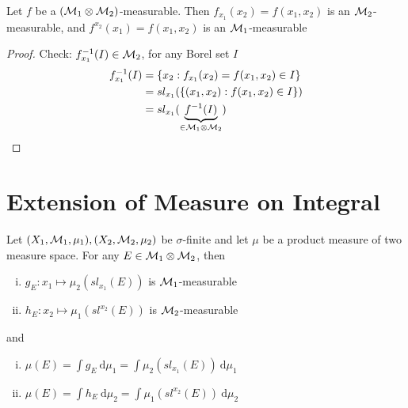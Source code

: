 \begin{lemma}
  Let $f$ be a $(\mathcal M_1 \otimes \mathcal M_2)$-measurable. Then $f_{x_1}(x_2) = f(x_1, x_2)$ is an $\mathcal M_2$-measurable,
  and $f^{x_2}(x_1) = f(x_1, x_2)$ is an $\mathcal M_1$-measurable
\end{lemma}

\begin{proof}
  Check: $f^{-1}_{x_1}(I) \in \mathcal M_2$, for any Borel set $I$
  \begin{align*}
    f^{-1}_{x_1}(I) &= \{x_2 : f_{x_1}(x_2) = f(x_1, x_2) \in I\} \\
    &= sl_{x_1}(\{(x_1, x_2) : f(x_1, x_2) \in I\}) \\
    &= sl_{x_1}(\underbrace{f^{-1}(I)}_{\in \mathcal M_1 \otimes \mathcal M_2})
  \end{align*}
\end{proof}

\section{Extension of Measure on Integral}

\begin{theorem}
  Let $(X_1, \mathcal M_1, \mu_1), (X_2, \mathcal M_2, \mu_2)$ be $\sigma$-finite and let $\mu$  be a product measure of two measure space.
  For any $E \in \mathcal M_1 \otimes \mathcal M_2$, then
  \begin{enumerate}[(i)]
    \item $g_E : x_1 \mapsto \mu_2(sl_{x_1}(E))$ is $\mathcal M_1$-measurable
    \item $h_E : x_2 \mapsto \mu_1(sl^{x_2}(E))$ is $\mathcal M_2$-measurable
  \end{enumerate}
  and 
  \begin{enumerate}[(i)]
    \item $\mu(E) = \int g_E \ \mathrm{d}\mu_1 = \int \mu_2(sl_{x_1}(E)) \ \mathrm{d}\mu_1$
    \item $\mu(E) = \int h_E \ \mathrm{d}\mu_2 = \int \mu_1(sl^{x_2}(E)) \ \mathrm{d}\mu_2$
  \end{enumerate}
\end{theorem}

